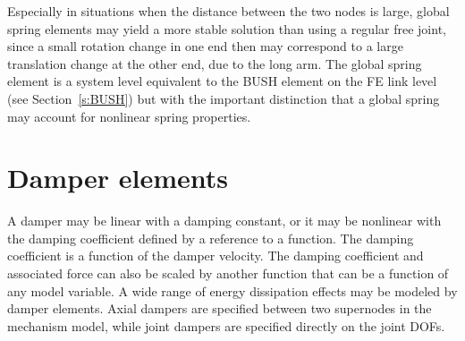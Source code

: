 
Especially in situations when the distance between the two nodes is large,
global spring elements may yield a more stable solution than using a regular
free joint, since a small rotation change in one end then may correspond to
a large translation change at the other end, due to the long arm.
The global spring element is a system level equivalent to the BUSH element
on the FE link level (see Section~\ref{s:BUSH}) but with the important
distinction that a global spring may account for nonlinear spring properties.

\section{Damper elements}
\label{s:Damper elements}

A damper may be linear with a damping constant, or it may be nonlinear with the
damping coefficient defined by a reference to a function.
The damping coefficient is a function of the damper velocity.
The damping coefficient and associated force can also be scaled by another
function that can be a function of any model variable.
A wide range of energy dissipation effects may be modeled by damper elements.
Axial dampers are specified between two supernodes in the mechanism model,
while joint dampers are specified directly on the joint DOFs.

